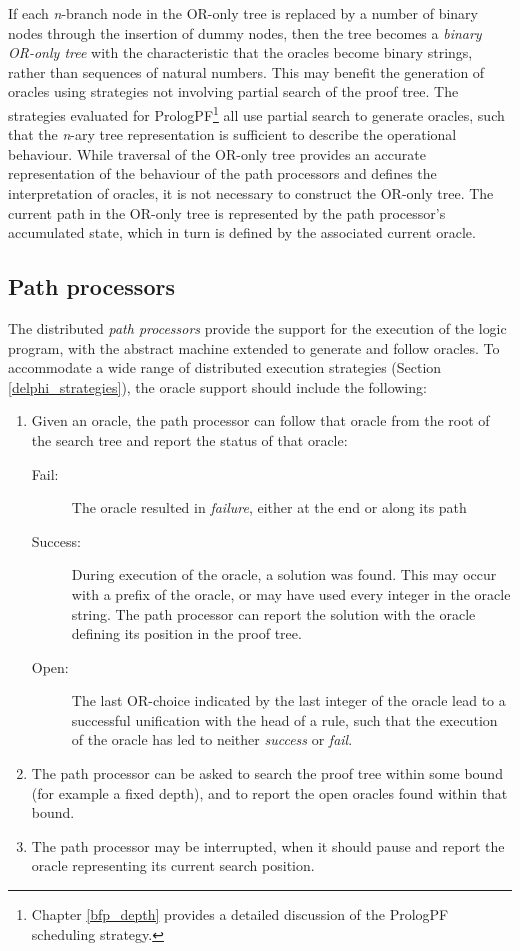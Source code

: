 If each \textit{n}-branch node in the OR-only tree is replaced by a
number of binary nodes through the insertion of dummy nodes, then the
tree becomes a \textit{binary OR-only tree} with the characteristic
that the oracles become binary strings, rather than sequences of natural numbers.
This may benefit the generation of oracles using strategies not involving
partial search of the proof tree.  The strategies evaluated for
PrologPF\footnote{Chapter \ref{bfp_depth} provides a detailed
discussion of the PrologPF scheduling strategy.}
all use partial search to generate oracles, such that
the \textit{n}-ary tree representation is sufficient to describe the
operational behaviour.  While traversal of the OR-only tree provides an
accurate representation of the behaviour of the path processors and
defines the interpretation of oracles, it is not
necessary to construct the OR-only tree.  The current path in the OR-only
tree is represented by the path processor's accumulated state, which
in turn is defined by the associated current oracle.
 
\subsection{Path processors}
\label{path_processors}

The distributed \textit{path processors} provide the support for the execution of
the logic program, with the abstract machine extended to generate and
follow oracles.  To accommodate a wide range of distributed execution
strategies (Section \ref{delphi_strategies}), the oracle support should
include the following:

\begin{enumerate}
\item{Given an oracle, the path processor can follow that oracle from the
  root of the search tree and report the status of that oracle:
  \begin{description}
  \item[Fail:]{The oracle resulted in  \textit{failure}, either at the end or along 
    its path}
  \item[Success:]{During execution of the oracle, a solution was found.
    This may occur with a prefix of the oracle, or may have
    used every integer in the oracle string.  The path processor can
    report the solution with the oracle defining its position in the
    proof tree.}
  \item[Open:]{The last OR-choice indicated by the last integer of the
    oracle lead to a successful unification with the head of a rule, such
    that the execution of the oracle has led to neither \textit{success}
    or \textit{fail}.}
  \end{description}}
\enlargethispage{2\baselineskip} %
\item{The path processor can be asked to search the proof tree within some
  bound (for example a fixed depth), and to report the open oracles found
  within that bound.}
\item{The path processor may be interrupted, when it should pause and report
  the oracle representing its current search position.}
\end{enumerate}

